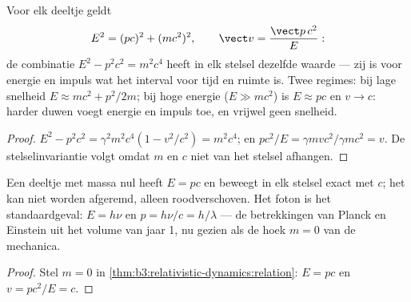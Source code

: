 \begin{theorem}\label{thm:b3:relativistic-dynamics:relation}
Voor elk deeltje geldt
\[
E^2 = (pc)^2 + (mc^2)^2 ,
\qquad
\vect v = \frac{\vect p\,c^2}{E} :
\]
de combinatie $E^2 - p^2c^2 = m^2c^4$ heeft in elk stelsel dezelfde
waarde --- zij is voor energie en impuls wat het interval voor tijd en
ruimte is. Twee regimes: bij lage snelheid $E \approx mc^2 + p^2/2m$; bij
hoge energie ($E \gg mc^2$) is $E \approx pc$ en $v \to c$: harder duwen
voegt energie en impuls toe, en vrijwel geen snelheid.
\end{theorem}

\begin{proof}
$E^2 - p^2c^2 = \gamma^2m^2c^4(1 - v^2/c^2) = m^2c^4$; en $pc^2/E =
\gamma mvc^2/\gamma mc^2 = v$. De stelselinvariantie volgt omdat $m$ en
$c$ niet van het stelsel afhangen.
\end{proof}

\begin{proposition}\label{prop:b3:relativistic-dynamics:massless}
Een deeltje met massa nul heeft $E = pc$ en beweegt in elk stelsel exact
met $c$; het kan niet worden afgeremd, alleen roodverschoven. Het foton
is het standaardgeval: $E = h\nu$ en $p = h\nu/c = h/\lambda$ --- de
betrekkingen van Planck en Einstein uit het volume van jaar 1, nu gezien
als de hoek $m = 0$ van de mechanica.
\end{proposition}

\begin{proof}
Stel $m = 0$ in \cref{thm:b3:relativistic-dynamics:relation}: $E = pc$ en
$v = pc^2/E = c$.
\end{proof}

